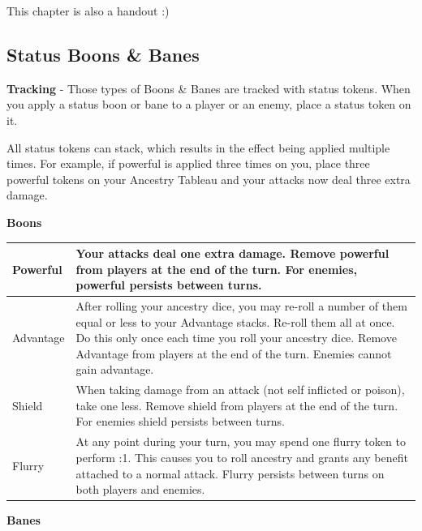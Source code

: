 \begin{tcolorbox}[colframe=black, colback=white]
	This chapter is also a handout :)
\end{tcolorbox}

\newpage

\subsection*{Status Boons \& Banes}
\textbf{Tracking} - Those types of Boons \& Banes are tracked with status tokens. When you apply a status boon or bane to a player or an enemy, place a status token on it.

\begin{tcolorbox}[colframe=black, colback=white]
	All status tokens can stack, which results in the effect being applied multiple times.
	For example, if powerful is applied three times on you, place three powerful tokens on your Ancestry Tableau and your attacks now deal three extra damage.
\end{tcolorbox}

\textbf{Boons} 
\begin{longtable}{|p{2.5cm}|p{13.7cm}|}
	
	\hline
	Powerful \symPowerful & Your attacks deal one extra damage. Remove powerful from players at the end of the turn. For enemies, powerful persists between turns. \\
	\hline
	Advantage \symAdvantage & After rolling your ancestry dice, you may re-roll a number of them equal or less to your Advantage stacks. Re-roll them all at once. Do this only once each time you roll your ancestry dice. Remove Advantage from players at the end of the turn. Enemies cannot gain advantage.\\
	\hline
	Shield \symShield & When taking damage from an \symAttack attack (not self inflicted or poison), take one less. Remove shield from players at the end of the turn. For enemies shield persists between turns. \\
	\hline
	Flurry \symFlurry & At any point during your turn, you may spend one flurry token to perform \symAttack:1. This causes you to roll ancestry and grants any benefit attached to a normal attack. Flurry persists between turns on both players and enemies. \\
	\hline
		
\end{longtable}

\textbf{Banes} 

